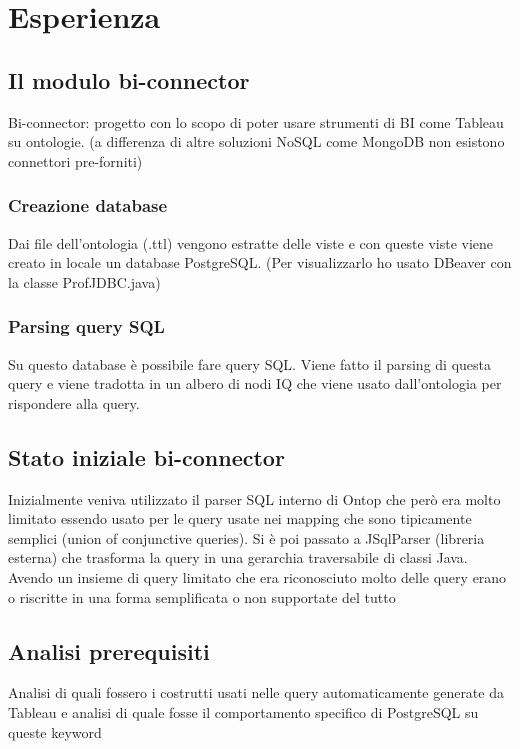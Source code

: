 \chapter{Esperienza}
\label{cha:experience}

\section{Il modulo bi-connector}
\label{sec:bi-connector}
Bi-connector: progetto con lo scopo di poter usare strumenti di BI come Tableau su ontologie. (a differenza di altre soluzioni NoSQL come MongoDB non esistono connettori pre-forniti)

\subsection{Creazione database}
\label{sec:bi-connector_db}
Dai file dell'ontologia (.ttl) vengono estratte delle viste e con queste viste viene creato in locale un database PostgreSQL. (Per visualizzarlo ho usato DBeaver con la classe ProfJDBC.java)

\subsection{Parsing query SQL}
\label{sec:bi-connector_parsing}
Su questo database è possibile fare query SQL. 
Viene fatto il parsing di questa query e viene tradotta in un albero di nodi IQ che viene usato dall'ontologia per rispondere alla query.

\section{Stato iniziale bi-connector}
\label{sec:experience_start}
Inizialmente veniva utilizzato il parser SQL interno di Ontop che però era molto limitato essendo usato per le query usate nei mapping che sono tipicamente semplici (union of conjunctive queries).
Si è poi passato a JSqlParser (libreria esterna) che trasforma la query in una gerarchia traversabile di classi Java.
Avendo un insieme di query limitato che era riconosciuto molto delle query erano o riscritte in una forma semplificata o non supportate del tutto

\section{Analisi prerequisiti}
\label{sec:section2}
Analisi di quali fossero i costrutti usati nelle query automaticamente generate da Tableau e analisi di quale fosse il comportamento specifico di PostgreSQL su queste keyword

